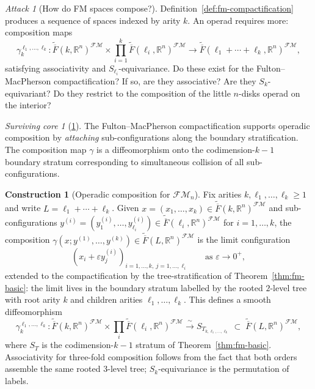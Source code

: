 \documentclass[11pt]{article}
\theoremstyle{definition}
\newtheorem{construction}[theorem]{Construction}
\theoremstyle{remark}
\newtheorem{attack}[theorem]{Attack}
\newtheorem{survivor}[theorem]{Surviving core}
\newcommand{\FMbar}{\overline{F}}
\newcommand{\FM}{\mathcal{FM}}
\begin{document}
\begin{attack}[How do FM spaces compose?]
\label{att:cycle-3}
Definition~\ref{def:fm-compactification} produces a sequence of spaces
indexed by arity $k$. An operad requires more: composition maps
\[
 \gamma_k^{\ell_1, \ldots, \ell_k} \colon
 \widetilde{\FMbar}(k, \mathbb{R}^n)^{\FM}
 \times \prod_{i=1}^{k} \widetilde{\FMbar}(\ell_i, \mathbb{R}^n)^{\FM}
 \longrightarrow
 \widetilde{\FMbar}(\ell_1 + \cdots + \ell_k, \mathbb{R}^n)^{\FM},
\]
satisfying associativity and $S_{\ell_i}$-equivariance. Do these exist
for the Fulton--MacPherson compactification? If so, are they associative?
Are they $S_k$-equivariant? Do they restrict to the composition of the
little $n$-disks operad on the interior?
\end{attack}

\begin{survivor}[\ref{att:cycle-3}]
The Fulton--MacPherson compactification supports operadic composition
by \emph{attaching} sub-configurations along the boundary stratification.
The composition map $\gamma$ is a diffeomorphism onto the
codimension-$k - 1$ boundary stratum corresponding to simultaneous
collision of all sub-configurations.
\end{survivor}

\begin{construction}[Operadic composition for $\FM_n$]
\label{constr:fm-composition}
Fix arities $k, \ell_1, \ldots, \ell_k \geq 1$ and write
$L = \ell_1 + \cdots + \ell_k$. Given
$x = (x_1, \ldots, x_k) \in \widetilde{\FMbar}(k, \mathbb{R}^n)^{\FM}$
and sub-configurations
$y^{(i)} = (y^{(i)}_1, \ldots, y^{(i)}_{\ell_i}) \in
 \widetilde{\FMbar}(\ell_i, \mathbb{R}^n)^{\FM}$
for $i = 1, \ldots, k$, the composition
$\gamma(x; y^{(1)}, \ldots, y^{(k)}) \in
 \widetilde{\FMbar}(L, \mathbb{R}^n)^{\FM}$
is the limit configuration
\[
 (x_i + \varepsilon y^{(i)}_j)_{i = 1, \ldots, k,\ j = 1, \ldots, \ell_i}
 \qquad \text{as } \varepsilon \to 0^+,
\]
extended to the compactification by the tree-stratification
of Theorem~\ref{thm:fm-basic}: the limit lives in the boundary
stratum labelled by the rooted $2$-level tree with root arity $k$ and
children arities $\ell_1, \ldots, \ell_k$. This defines a smooth
diffeomorphism
\[
 \gamma_k^{\ell_1, \ldots, \ell_k} \colon
 \widetilde{\FMbar}(k, \mathbb{R}^n)^{\FM}
 \times \prod_{i} \widetilde{\FMbar}(\ell_i, \mathbb{R}^n)^{\FM}
 \xrightarrow{\ \sim\ }
 S_{T_{k, \ell_1, \ldots, \ell_k}}
 \;\subset\;
 \widetilde{\FMbar}(L, \mathbb{R}^n)^{\FM},
\]
where $S_T$ is the codimension-$k - 1$ stratum of
Theorem~\ref{thm:fm-basic}. Associativity for three-fold composition
follows from the fact that both orders assemble the same rooted
$3$-level tree; $S_k$-equivariance is the permutation of labels.
\end{construction}
\end{document}
